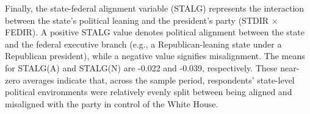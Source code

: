 Finally, the state-federal alignment variable (STALG) represents the interaction between the state's political leaning and the president's party (STDIR × FEDIR). A positive STALG value denotes political alignment between the state and the federal executive branch (e.g., a Republican-leaning state under a Republican president), while a negative value signifies misalignment. The means for STALG(A) and STALG(N) are -0.022 and -0.039, respectively. These near-zero averages indicate that, across the sample period, respondents' state-level political environments were relatively evenly split between being aligned and misaligned with the party in control of the White House.